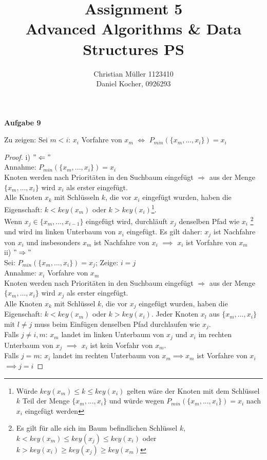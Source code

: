 \documentclass{article}
\begin{document}
\title{Assignment 5 \\ Advanced Algorithms \& Data Structures PS}%
\author{Christian Müller 1123410 \\ Daniel Kocher, 0926293}%
\maketitle

{\noindent\bfseries Aufgabe 9}%
\medskip%

\noindent
Zu zeigen: Sei $m < i$: $x_{i}$ Vorfahre von $x_{m}$ $\Leftrightarrow$ $P_{min}(\lbrace x_{m},...,x_{i} \rbrace)=x_{i}$ \\

\begin{proof}
\noindent

\noindent
i) $"\Leftarrow"$\\
Annahme: $P_{min}(\lbrace x_{m},...,x_{i} \rbrace)=x_{i}$\\
Knoten werden nach Prioritäten in den Suchbaum eingefügt $\Rightarrow$ aus der Menge $\lbrace x_{m},...,x_{i} \rbrace$ wird $x_{i}$ als erster eingefügt.\\
Alle Knoten $x_{k}$ mit Schlüsseln $k$, die vor $x_{i}$ eingefügt wurden, haben die Eigenschaft: $k < key(x_{m})$ oder $k > key(x_{i})$\footnote[1]{Würde $key(x_{m}) \leq k \leq key(x_{i})$ gelten wäre der Knoten mit dem Schlüssel $k$ Teil der Menge $\lbrace x_{m},...,x_{i} \rbrace$ und würde wegen $P_{min}(\lbrace x_{m},...,x_{i} \rbrace)=x_{i}$ nach $x_{i}$ eingefügt werden}.\\
Wenn $x_{j} \in \lbrace x_{m},...,x_{i-1} \rbrace$ eingefügt wird, durchläuft $x_{j}$ denselben Pfad wie $x_{i}$ \footnote[2]{Es gilt für alle sich im Baum befindlichen Schlüssel $k$, 
$k < key(x_{m}) \leq key(x_{j}) \leq key(x_{i})$  oder $k > key(x_{i}) \geq key(x_{j}) \geq key(x_{m})$ } und wird im linken Unterbaum von $x_{i}$ eingefügt.
Es gilt daher: $x_{j}$ ist Nachfahre von $x_{i}$ und insbesonders $x_{m}$ ist Nachfahre von $x_{i}$ $\implies$ $x_{i}$ ist Vorfahre von $x_{m}$\\

\noindent
ii) $"\Rightarrow"$\\
Sei: $P_{min}(\lbrace x_{m},...,x_{i} \rbrace)=x_{j}$; Zeige: $i=j$\\
Annahme: $x_{i}$ Vorfahre von $x_{m}$\\
Knoten werden nach Prioritäten in den Suchbaum eingefügt $\Rightarrow$ aus der Menge $\lbrace x_{m},...,x_{i} \rbrace$ wird $x_{j}$ als erster eingefügt.\\
Alle Knoten $x_{k}$ mit Schlüssel $k$, die vor $x_{j}$ eingefügt wurden, haben die Eigenschaft: $k < key(x_{m})$ oder $k > key(x_{i})$.
Jeder Knoten $x_{l}$ aus $\lbrace x_{m},...,x_{i} \rbrace$ mit $l \neq j$ muss beim Einfügen denselben Pfad durchlaufen wie $x_{j}$.\\
Falls $j \neq i,m$: $x_{m}$ landet im linken Unterbaum von $x_{j}$ und $x_{i}$ im rechten Unterbaum von $x_{j}$ $\implies$ $x_{i}$ ist kein Vorfahr von $x_{m}$.\\
Falls $j=m$: $x_{i}$ landet im rechten Unterbaum von $x_{m} \implies x_{m}$ ist Vorfahre von $x_{i}$\\
$\implies j=i$ 
\end{proof}
\end{document}

